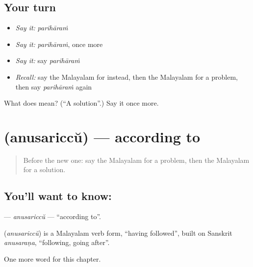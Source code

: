 \subsection*{Your turn}
\begin{itemize}
\raggedright
  \item \emph{Say it:} \emph{parihāraṁ}
  \item \emph{Say it:} \emph{parihāraṁ}, once more
  \item \emph{Say it:} say \emph{parihāraṁ}
  \item \emph{Recall:} say the Malayalam for instead, then the Malayalam for a problem, then say \emph{parihāraṁ} again
\end{itemize}

\begin{tcolorbox}[breakable,colback=teal!4,colframe=teal!35!black,title={Before you move on}]
What does  mean? (\textquotedblleft{}A solution\textquotedblright{}.) Say it once more.
\end{tcolorbox}
\section[\texorpdfstring{\ml{അനുസരിച്ച്} (anusariccŭ)}{അനുസരിച്ച് (anusariccŭ)}]{ (anusariccŭ) — according to}

\label{lesson:ML-C200-anusariccu}



\begin{quote}
Before the new one: say the Malayalam for a problem, then the Malayalam for a solution.
\end{quote}

\subsection*{You'll want to know: }
\textbf{} — \emph{anusariccŭ} — \textquotedblleft{}according to\textquotedblright{}.

\begin{cousinweb}
\textbf{} (\emph{anusariccŭ}) is a Malayalam verb form, \textquotedblleft{}having followed\textquotedblright{}, built on Sanskrit \emph{anusaraṇa}, \textquotedblleft{}following, going after\textquotedblright{}.
\end{cousinweb}

\begin{grammarlens}[title={What you've built}]
One more word for this chapter.
\end{grammarlens}

